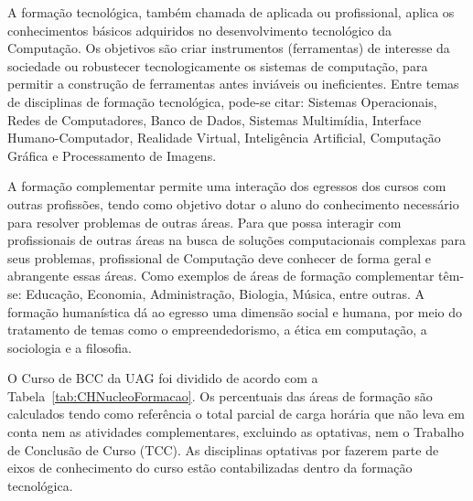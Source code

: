 \documentclass[
	12pt,				%
	openright,			%
  oneside,     %
	a4paper,			%
	english,			%
	french,				%
	spanish,			%
	brazil				%
	]{abntex2}
\begin{document}
A formação tecnológica, também chamada de aplicada ou profissional, aplica os conhecimentos básicos adquiridos no desenvolvimento tecnológico da Computação. Os objetivos são criar instrumentos (ferramentas) de interesse da sociedade ou robustecer tecnologicamente os sistemas de computação, para permitir a construção de ferramentas antes inviáveis ou ineficientes. Entre temas de disciplinas de formação tecnológica, pode-se citar: Sistemas Operacionais, Redes de Computadores, Banco de Dados, Sistemas Multimídia, Interface Humano-Computador, Realidade Virtual, Inteligência Artificial, Computação Gráfica e Processamento de Imagens.

A formação complementar permite uma interação dos egressos dos cursos com outras profissões, tendo como objetivo dotar o aluno do conhecimento necessário para resolver problemas de outras áreas. Para que possa interagir com profissionais de outras áreas na busca de soluções computacionais complexas para seus problemas, profissional de Computação deve conhecer de forma geral e abrangente essas áreas. Como exemplos de áreas de formação complementar têm-se: Educação, Economia, Administração, Biologia, Música, entre outras. A formação humanística dá ao egresso uma dimensão social e humana, por meio do tratamento de temas como o empreendedorismo, a ética em computação, a sociologia e a filosofia. 

O Curso de BCC da UAG foi dividido de acordo com a Tabela~\ref{tab:CHNucleoFormacao}. Os percentuais das áreas de formação são calculados tendo como referência o total parcial de carga horária que não leva em conta nem as atividades complementares, excluindo as optativas, nem o Trabalho de Conclusão de Curso (TCC). As disciplinas optativas por fazerem parte de eixos de conhecimento do curso estão contabilizadas dentro da formação tecnológica.
\end{document}
